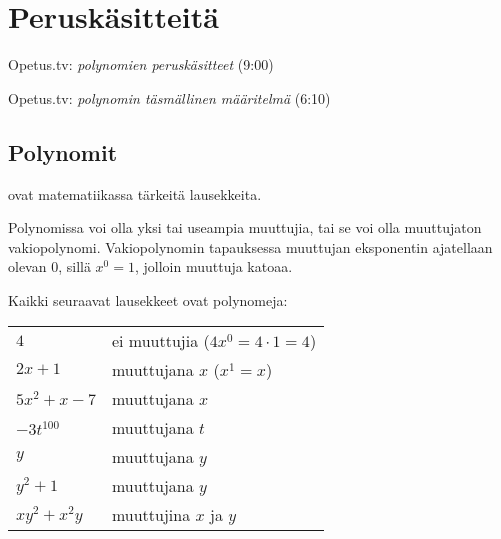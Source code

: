 \section{Peruskäsitteitä}

{Opetus.tv: \emph{polynomien peruskäsitteet} (9:00)}

{Opetus.tv: \emph{polynomin täsmällinen määritelmä} (6:10)}

\subsection*{Polynomit}

 ovat matematiikassa tärkeitä lausekkeita.


Polynomissa voi olla yksi tai useampia muuttujia, tai se voi olla muuttujaton vakiopolynomi. Vakiopolynomin tapauksessa muuttujan eksponentin ajatellaan olevan $0$, sillä $x^0=1$, jolloin muuttuja katoaa.

\begin{esimerkki}
Kaikki seuraavat lausekkeet ovat polynomeja:

\begin{tabular}{ll}
$4$ &  ei muuttujia ($4x^0=4 \cdot 1=4$)\\
$2x+1$ &  muuttujana $x$ ($x^1=x$)\\
$5x^2+x-7$ &   muuttujana $x$\\
$-3t^{100}$& muuttujana $t$\\
$y$& muuttujana $y$\\
$y^2+1$& muuttujana $y$\\
$xy^2+x^2y$& muuttujina $x$ ja $y$
\end{tabular}

\end{esimerkki}

